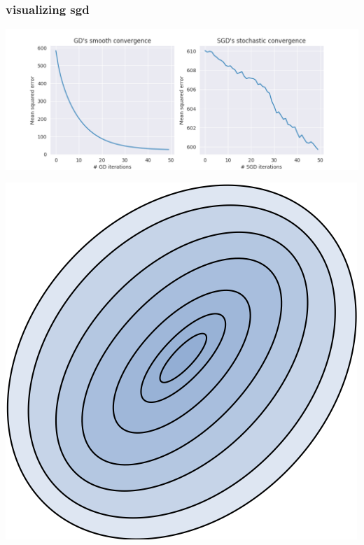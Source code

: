 \documentclass[compress]{beamer}
\begin{document}
\begin{frame}[t]
	\frametitle{visualizing sgd}
	\begin{center}
		\includegraphics[height=.45\textheight]{gd_convergence.png}
		
		\includegraphics[height=.4\textheight]{gd_paths_raw.png}
	\end{center}	
\end{frame}
\end{document}
